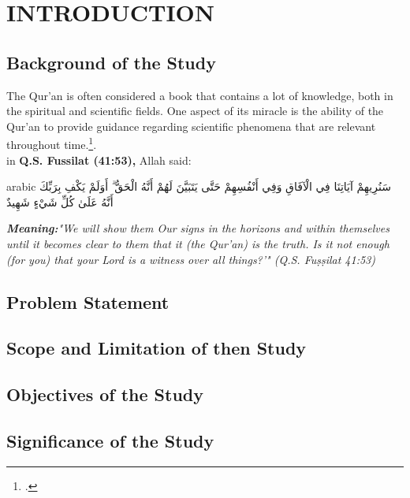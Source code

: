 \chapter{INTRODUCTION}
	\section{Background of the Study}
	\setlength{\leftskip}{0.7cm}
	The Qur'an is often considered a book that contains a lot of knowledge, both in the spiritual and scientific fields. One aspect of its miracle is the ability of the Qur'an to provide guidance regarding scientific phenomena that are relevant throughout time.\footcite{bakir2016}.\\
	in \textbf{Q.S. Fussilat (41:53),} Allah said:\\
	
\begin{otherlanguage*}{arabic}
	\noindent
سَنُرِيهِمْ آيَاتِنَا فِي الْآفَاقِ وَفِي أَنْفُسِهِمْ حَتَّى يَتَبَيَّنَ لَهُمْ أَنَّهُ الْحَقُّ ۗ أَوَلَمْ يَكْفِ بِرَبِّكَ أَنَّهُ عَلَىٰ كُلِّ شَيْءٍ شَهِيدٌ
\end{otherlanguage*}
	\vspace{0.5cm}

	\textit{\textbf{Meaning:}"We will show them Our signs in the horizons and within themselves until it becomes clear to them that it (the Qur'an) is the truth. Is it not enough (for you) that your Lord is a witness over all things?'" (Q.S. Fuṣṣilat 41:53)}\\
	
	\section{Problem Statement}
	\lipsum
	
	\section{Scope and Limitation of then Study}
	\lipsum
	
	\section{Objectives of the Study}
	\lipsum
	
	\section{Significance of the Study}
	\lipsum
	